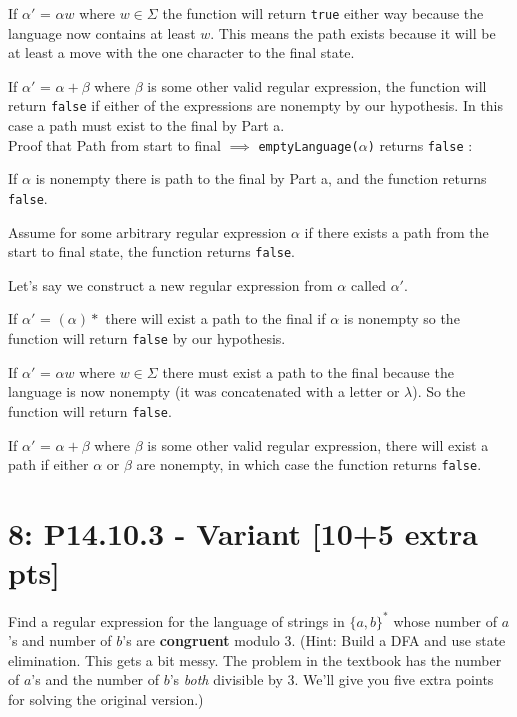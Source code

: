 \documentclass[12pt]{article}
\begin{document}
\begin{enumerate}[(a)]
If $\alpha '$ = $\alpha w$ where $w \in \Sigma$ the function will return \texttt{true} either way because the language now contains at least $w$. This means the path exists because it will be at least a move with the one character to the final state.

If $\alpha '$ = $\alpha + \beta$ where $\beta$ is some other valid regular expression, the function will return \texttt{false} if either of the expressions are nonempty by our hypothesis. In this case a path must exist to the final by Part a. \\

Proof that Path from start to final $\implies$ \texttt{emptyLanguage($\alpha$)} returns \texttt{false} :

If $\alpha$ is nonempty there is path to the final by Part a, and the function returns \texttt{false}.

Assume for some arbitrary regular expression $\alpha$ if there exists a path from the start to final state, the function returns \texttt{false}.

Let's say we construct a new regular expression from $\alpha$ called $\alpha '$. 

If $\alpha '$ = $(\alpha )*$ there will exist a path to the final if $\alpha$ is nonempty so the function will return \texttt{false} by our hypothesis.

If $\alpha '$ = $\alpha w$ where $w \in \Sigma$ there must exist a path to the final because the language is now nonempty (it was concatenated with a letter or $\lambda$). So the function will return \texttt{false}.

If $\alpha '$ = $\alpha + \beta$ where $\beta$ is some other valid regular expression, there will exist a path if either $\alpha$ or $\beta$ are nonempty, in which case the function returns \texttt{false}.

\end{enumerate}


\newpage
\section*{\textbf{8: P14.10.3 - Variant} [10+5 extra pts]}
Find a regular expression for the language of strings in $\{a, b\}^*$ whose number of $a$’s and number of $b$’s are \textbf{congruent} modulo 3. (Hint: Build a DFA and use state elimination. This gets a bit messy. The problem in the textbook has the number of $a$’s and the number of $b$'s \textit{both} divisible by 3. We’ll give you five extra points for solving the original version.)
\end{document}
